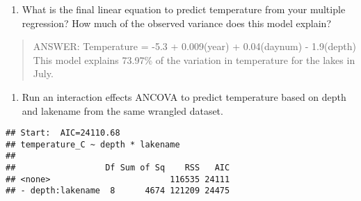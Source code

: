 \documentclass[]{article}
\newenvironment{Shaded}{\begin{snugshade}}{\end{snugshade}}
\newcommand{\KeywordTok}[1]{\textcolor[rgb]{0.13,0.29,0.53}{\textbf{#1}}}
\newcommand{\DataTypeTok}[1]{\textcolor[rgb]{0.13,0.29,0.53}{#1}}
\newcommand{\StringTok}[1]{\textcolor[rgb]{0.31,0.60,0.02}{#1}}
\newcommand{\CommentTok}[1]{\textcolor[rgb]{0.56,0.35,0.01}{\textit{#1}}}
\newcommand{\OperatorTok}[1]{\textcolor[rgb]{0.81,0.36,0.00}{\textbf{#1}}}
\newcommand{\NormalTok}[1]{#1}
\providecommand{\tightlist}{%
  \setlength{\itemsep}{0pt}\setlength{\parskip}{0pt}}
\begin{document}
\begin{enumerate}
\def\labelenumi{\arabic{enumi}.}
\setcounter{enumi}{12}
\tightlist
\item
  What is the final linear equation to predict temperature from your
  multiple regression? How much of the observed variance does this model
  explain?
\end{enumerate}

\begin{quote}
ANSWER: Temperature = -5.3 + 0.009(year) + 0.04(daynum) - 1.9(depth)
This model explains 73.97\% of the variation in temperature for the
lakes in July.
\end{quote}

\begin{enumerate}
\def\labelenumi{\arabic{enumi}.}
\setcounter{enumi}{13}
\tightlist
\item
  Run an interaction effects ANCOVA to predict temperature based on
  depth and lakename from the same wrangled dataset.
\end{enumerate}

\begin{Shaded}
\end{Shaded}

\begin{verbatim}
## Start:  AIC=24110.68
## temperature_C ~ depth * lakename
## 
##                  Df Sum of Sq    RSS   AIC
## <none>                        116535 24111
## - depth:lakename  8      4674 121209 24475
\end{verbatim}
\end{document}
